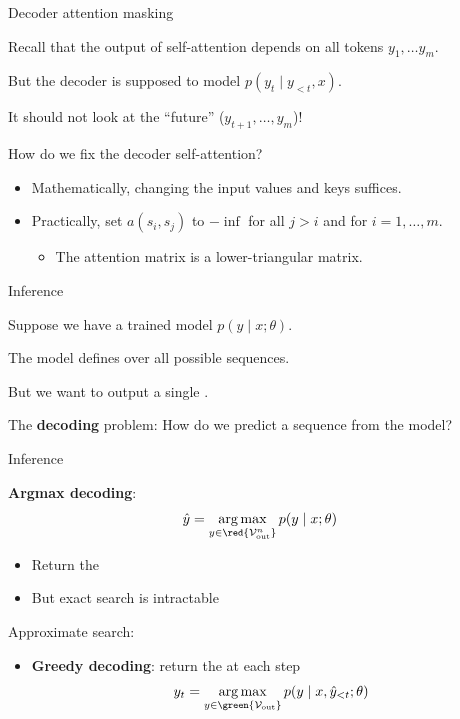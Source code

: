 \documentclass[usenames,dvipsnames,notes,11pt,aspectratio=169,hyperref={colorlinks=true, linkcolor=blue}]{beamer}
\begin{document}
\begin{frame}
    {Decoder attention masking}

    Recall that the output of self-attention depends on all tokens $y_1,\ldots y_m$.

    But the decoder is supposed to model $p(y_t\mid y_{<t}, x)$.

    It should not look at the ``future'' ($y_{t+1},\ldots,y_m$)!

    \pause
    How do we fix the decoder self-attention?\\
    \begin{itemize}
        \item Mathematically, changing the input values and keys suffices.
        \item Practically, set $a(s_i, s_j)$ to $-\inf$ for all $j>i$ and for $i=1,\ldots,m$.
            \begin{itemize}
                \item The attention matrix is a lower-triangular matrix.
            \end{itemize}
    \end{itemize}
\end{frame}


\begin{frame}
    {Inference}

    Suppose we have a trained model $p(y\mid x;\theta)$.

    The model defines  over all possible sequences.

    But we want to output a single .

    The \textbf{decoding} problem: How do we predict a sequence from the model?
\end{frame}

\begin{frame}
    {Inference}

    \textbf{Argmax decoding}: 
    $$
    \hat{y} = \argmax_{y\in\red{\sV_{\text{out}}^n}} p(y\mid x; \theta)
    $$
    \vspace{-1em}
    \begin{itemize}
        \item Return the 
        \item But exact search is intractable 
    \end{itemize}

    \pause
    Approximate search:\\
    \begin{itemize}
        \item \textbf{Greedy decoding}: return the  at each step
            $$
            y_t = \argmax_{y\in\green{\sV_{\text{out}}}} p(y\mid x, \hat{y}_{<t}; \theta)
            $$
    \end{itemize}
\end{frame}
\end{document}
